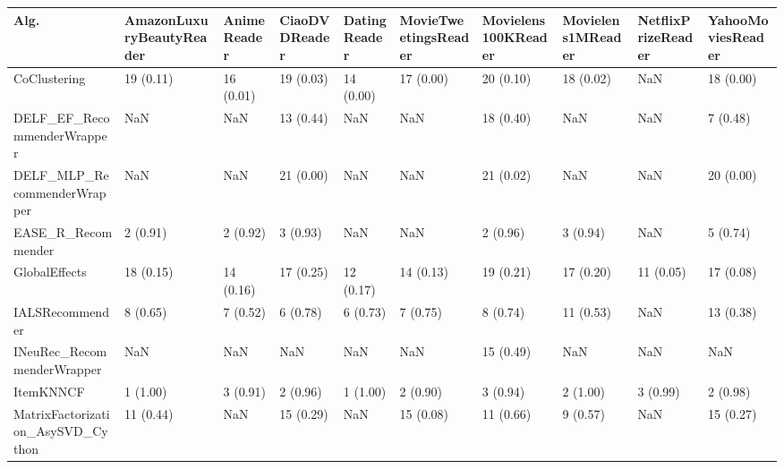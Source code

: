 \begin{tabular}{llllllllll}
\toprule
                               Alg. & AmazonLuxuryBeautyReader & AnimeReader & CiaoDVDReader & DatingReader & MovieTweetingsReader & Movielens100KReader & Movielens1MReader & NetflixPrizeReader & YahooMoviesReader \\
\midrule
                       CoClustering &                19 (0.11) &   16 (0.01) &     19 (0.03) &    14 (0.00) &            17 (0.00) &           20 (0.10) &         18 (0.02) &                NaN &         18 (0.00) \\
         DELF\_EF\_RecommenderWrapper &                      NaN &         NaN &     13 (0.44) &          NaN &                  NaN &           18 (0.40) &               NaN &                NaN &          7 (0.48) \\
        DELF\_MLP\_RecommenderWrapper &                      NaN &         NaN &     21 (0.00) &          NaN &                  NaN &           21 (0.02) &               NaN &                NaN &         20 (0.00) \\
                 EASE\_R\_Recommender &                 2 (0.91) &    2 (0.92) &      3 (0.93) &          NaN &                  NaN &            2 (0.96) &          3 (0.94) &                NaN &          5 (0.74) \\
                      GlobalEffects &                18 (0.15) &   14 (0.16) &     17 (0.25) &    12 (0.17) &            14 (0.13) &           19 (0.21) &         17 (0.20) &          11 (0.05) &         17 (0.08) \\
                    IALSRecommender &                 8 (0.65) &    7 (0.52) &      6 (0.78) &     6 (0.73) &             7 (0.75) &            8 (0.74) &         11 (0.53) &                NaN &         13 (0.38) \\
         INeuRec\_RecommenderWrapper &                      NaN &         NaN &           NaN &          NaN &                  NaN &           15 (0.49) &               NaN &                NaN &               NaN \\
                          ItemKNNCF &                 1 (1.00) &    3 (0.91) &      2 (0.96) &     1 (1.00) &             2 (0.90) &            3 (0.94) &          2 (1.00) &           3 (0.99) &          2 (0.98) \\
  MatrixFactorization\_AsySVD\_Cython &                11 (0.44) &         NaN &     15 (0.29) &          NaN &            15 (0.08) &           11 (0.66) &          9 (0.57) &                NaN &         15 (0.27) \\

\end{tabular}
